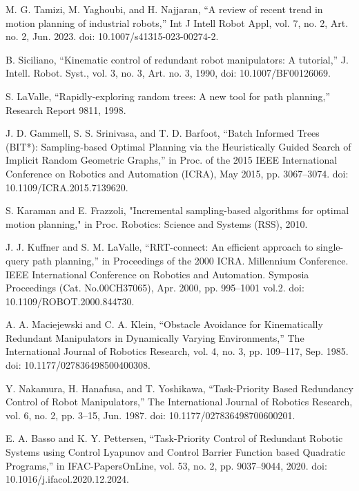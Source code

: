 \documentclass[letterpaper, 10 pt, conference]{ieeeconf}  %
\begin{document}
\begin{thebibliography}{99}
	
 M. G. Tamizi, M. Yaghoubi, and H. Najjaran, “A review of recent trend in motion planning of industrial robots,” Int J Intell Robot Appl, vol. 7, no. 2, Art. no. 2, Jun. 2023. doi: 10.1007/s41315-023-00274-2.
	
 B. Siciliano, “Kinematic control of redundant robot manipulators: A tutorial,” J. Intell. Robot. Syst., vol. 3, no. 3, Art. no. 3, 1990, doi: 10.1007/BF00126069.

 S. LaValle, “Rapidly-exploring random trees: A new tool for path planning,” Research Report 9811, 1998.

 J. D. Gammell, S. S. Srinivasa, and T. D. Barfoot, “Batch Informed Trees (BIT*): Sampling-based Optimal Planning via the Heuristically Guided Search of Implicit Random Geometric Graphs,” in Proc. of the 2015 IEEE International Conference on Robotics and Automation (ICRA), May 2015, pp. 3067–3074. doi: 10.1109/ICRA.2015.7139620.

 S. Karaman and E. Frazzoli, "Incremental sampling-based algorithms for optimal motion planning," in Proc. Robotics: Science and Systems (RSS), 2010.

 J. J. Kuffner and S. M. LaValle, “RRT-connect: An efficient approach to single-query path planning,” in Proceedings of the 2000 ICRA. Millennium Conference. IEEE International Conference on Robotics and Automation. Symposia Proceedings (Cat. No.00CH37065), Apr. 2000, pp. 995–1001 vol.2. doi: 10.1109/ROBOT.2000.844730.

 A. A. Maciejewski and C. A. Klein, “Obstacle Avoidance for Kinematically Redundant Manipulators in Dynamically Varying Environments,” The International Journal of Robotics Research, vol. 4, no. 3, pp. 109–117, Sep. 1985. doi: 10.1177/027836498500400308.

 Y. Nakamura, H. Hanafusa, and T. Yoshikawa, “Task-Priority Based Redundancy Control of Robot Manipulators,” The International Journal of Robotics Research, vol. 6, no. 2, pp. 3–15, Jun. 1987. doi: 10.1177/027836498700600201.

 E. A. Basso and K. Y. Pettersen, “Task-Priority Control of Redundant Robotic Systems using Control Lyapunov and Control Barrier Function based Quadratic Programs,” in IFAC-PapersOnLine, vol. 53, no. 2, pp. 9037–9044, 2020. doi: 10.1016/j.ifacol.2020.12.2024.


\end{thebibliography}
\end{document}
